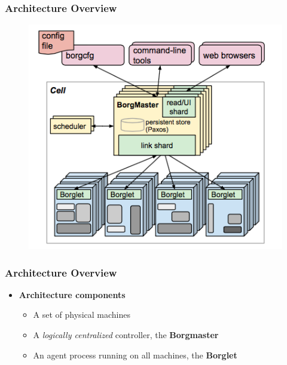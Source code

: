\begin{frame}
\frametitle{Architecture Overview}
\begin{figure}[h]
  \centering
  \includegraphics[scale=0.5]{./figures/borg_architecture}
  \label{fig:borg_arch}
\end{figure}
\end{frame}

\begin{frame}
\frametitle{Architecture Overview}
\begin{itemize}
	\item {\bf Architecture components}
	\begin{itemize}
		\item A set of physical machines
		\item A {\it logically centralized} controller, the {\bf Borgmaster}
		\item An agent process running on all machines, the {\bf Borglet}
	\end{itemize}
\end{itemize}
\end{frame}

